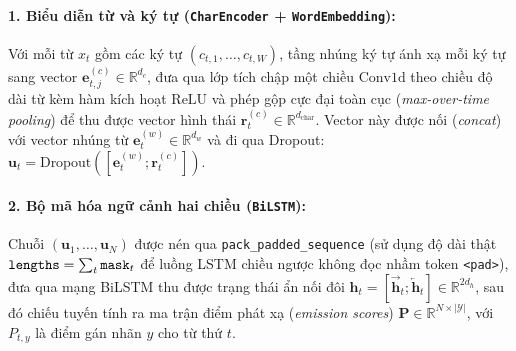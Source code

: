 \documentclass[11pt,a4paper,twocolumn]{article}
\begin{document}
\paragraph{1. Biểu diễn từ và ký tự (\texttt{CharEncoder} + \texttt{WordEmbedding}):}
Với mỗi từ $x_t$ gồm các ký tự $(c_{t,1}, \dots, c_{t,W})$, tầng nhúng ký tự ánh xạ mỗi ký tự sang vector $\mathbf{e}^{(c)}_{t,j} \in \mathbb{R}^{d_c}$, đưa qua lớp tích chập một chiều $\text{Conv1d}$ theo chiều độ dài từ kèm hàm kích hoạt $\text{ReLU}$ và phép gộp cực đại toàn cục (\textit{max-over-time pooling}) để thu được vector hình thái $\mathbf{r}^{(c)}_t \in \mathbb{R}^{d_{\text{char}}}$. Vector này được nối (\textit{concat}) với vector nhúng từ $\mathbf{e}^{(w)}_t \in \mathbb{R}^{d_w}$ và đi qua Dropout: $\mathbf{u}_t = \text{Dropout}([\mathbf{e}^{(w)}_t ; \mathbf{r}^{(c)}_t])$.

\paragraph{2. Bộ mã hóa ngữ cảnh hai chiều (\texttt{BiLSTM}):}
Chuỗi $(\mathbf{u}_1, \dots, \mathbf{u}_N)$ được nén qua \texttt{pack\_padded\_sequence} (sử dụng độ dài thật $\text{\texttt{lengths}} = \sum_t \text{\texttt{mask}}_t$ để luồng LSTM chiều ngược không đọc nhầm token \texttt{<pad>}), đưa qua mạng BiLSTM thu được trạng thái ẩn nối đôi $\mathbf{h}_t = [\overrightarrow{\mathbf{h}}_t ; \overleftarrow{\mathbf{h}}_t] \in \mathbb{R}^{2 d_h}$, sau đó chiếu tuyến tính ra ma trận điểm phát xạ (\textit{emission scores}) $\mathbf{P} \in \mathbb{R}^{N \times |\mathcal{Y}|}$, với $P_{t, y}$ là điểm gán nhãn $y$ cho từ thứ $t$.
\end{document}
